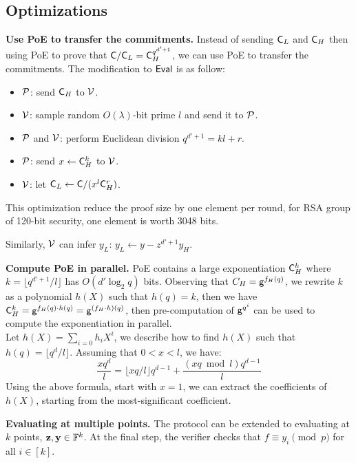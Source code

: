 \subsection{Optimizations}
\label{sec-dark-optimization}

\textbf{Use PoE to transfer the commitments.} Instead of sending $\mathsf{C}_L$ and $\mathsf{C}_H$ then using PoE to prove that $\mathsf{C} / \mathsf{C}_L = \mathsf{C}_H^{q^{d'+1}}$, we can use PoE to transfer the commitments. The modification to $\mathsf{Eval}$ is as follow:
\begin{itemize}
    \item $\mathcal{P}$: send $\mathsf{C}_H$ to $\mathcal{V}$.
    \item $\mathcal{V}$: sample random $O(\lambda)$-bit prime $l$ and send it to $\mathcal{P}$.
    \item $\mathcal{P}$ and $\mathcal{V}$: perform Euclidean division $q^{d'+1} = k l + r$.
    \item $\mathcal{P}$: send $x \gets \mathsf{C}_H^k$ to $\mathcal{V}$.
    \item $\mathcal{V}$: let $\mathsf{C}_L \gets \mathsf{C} / (x^l \mathsf{C}_H^r)$.
\end{itemize}
This optimization reduce the proof size by one element per round, for RSA group of 120-bit security, one element is worth 3048 bits.

Similarly, $\mathcal{V}$ can infer $y_L$: $y_L \gets y - z^{d' + 1} y_H$.

\textbf{Compute PoE in parallel.} PoE contains a large exponentiation $\mathsf{C}_H^k$ where $k = \lfloor q^{d' + 1} / l \rfloor$ has $O(d' \log_2 q)$ bits. Observing that $C_H = \mathsf{g}^{f_H(q)}$, we rewrite $k$ as a polynomial $h(X)$ such that $h(q) = k$, then we have $\mathsf{C}_H^k = \mathsf{g}^{f_H(q) \cdot h(q)} = \mathsf{g}^{(f_H \cdot h)(q)}$, then pre-computation of $\mathsf{g}^{q^i}$ can be used to compute the exponentiation in parallel.\\
Let $h(X) = \sum_{i=0} h_i X^i$, we describe how to find $h(X)$ such that $h(q) = \lfloor q^d / l \rfloor$. Assuming that $0 < x < l$, we have:
$$\frac{xq^d}{l} = \lfloor xq / l \rfloor q^{d-1} + \frac{(xq \bmod l)q^{d-1}}{l}$$
Using the above formula, start with $x = 1$, we can extract the coefficients of $h(X)$, starting from the most-significant coefficient.

\textbf{Evaluating at multiple points.} The protocol can be extended to evaluating at $k$ points, $\mathbf{z}, \mathbf{y} \in \mathbb{F}^k$. At the final step, the verifier checks that $f \equiv y_i \pmod p$ for all $i \in [k]$.


